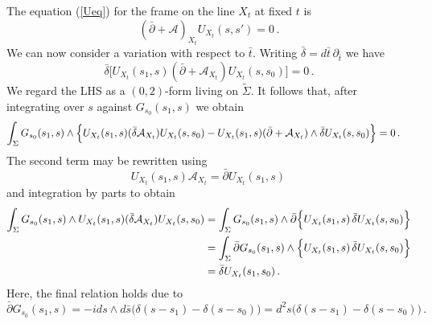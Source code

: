 \documentclass[12pt]{article}
\def \be  {\begin{equation}}
\def \ee  {\end{equation}}
\numberwithin{equation}{section}
\begin{document}
The equation (\ref{Ueq}) for the frame on the line $X_t$ at fixed $t$ is
\be
(\bar{\partial} + \mathcal{A})_{X_t} U_{X_t}(s,s') = 0\,.
\label{UeqXt}
\ee
We can now consider a variation with respect to $\bar{t}$. Writing $\bar{\delta} = d\bar{t} \,\partial_{\bar{t}}$ we have
\be
\bar{\delta} \bigl[U_{X_t}(s_1,s)(\bar{\partial} + \mathcal{A}_{X_t})U_{X_t}(s,s_0)\bigr] = 0\,.
\label{deltabarUAU}
\ee
We regard the LHS as a $(0,2)$-form living on $\tilde{\Sigma}$.
It follows that, after integrating over $s$ against $G_{s_0}(s_1,s)$ we obtain
\begin{align}
\int_\Sigma G_{s_0}(s_1,s) \wedge \Bigl\{ 
& U_{X_t}(s_1,s)(\bar{\delta}\mathcal{A}_{X_t}) U_{X_t}(s,s_0)  - U_{X_t}(s_1,s)(\bar{\partial} + \mathcal{A}_{X_t}) \wedge \bar{\delta} U_{X_t}(s,s_0)  \Bigr\} =0\,. \label{deltabarid}
\end{align}
The second term may be rewritten using 
\be
U_{X_t}(s_1,s) \mathcal{A}_{X_t} = \bar{\partial} U_{X_t}(s_1,s)\,
\label{UA=dbarU}
\ee
and integration by parts to obtain
\begin{align}
    \int_\Sigma G_{s_0}(s_1,s) \wedge U_{X_t}(s_1,s)(\bar{\delta}\mathcal{A}_{X_t}) U_{X_t}(s,s_0) &= \int_\Sigma G_{s_0}(s_1,s) \wedge \bar{\partial} \Bigl\{ U_{X_t}(s_1,s) \,\bar{\delta} U_{X_t}(s,s_0) \Bigr\} \notag \\
    &= \int_\Sigma \bar{\partial} G_{s_0}(s_1,s) \wedge \Bigl\{ U_{X_t}(s_1,s) \,\bar{\delta} U_{X_t}(s,s_0) \Bigr\} \notag \\
    &=  \bar{\delta} U_{X_t}(s_1,s_0) \,.
    \label{deltabarU}
\end{align}
Here, the final relation holds due to 
\be
\bar{\partial} G_{s_0}(s_1,s) = -i ds \wedge d \bar{s} \bigl(\delta(s-s_1) - \delta(s-s_0)\bigr) = d^2 s \bigl(\delta(s-s_1) - \delta(s-s_0)\bigr)\,.
\ee
\end{document}
